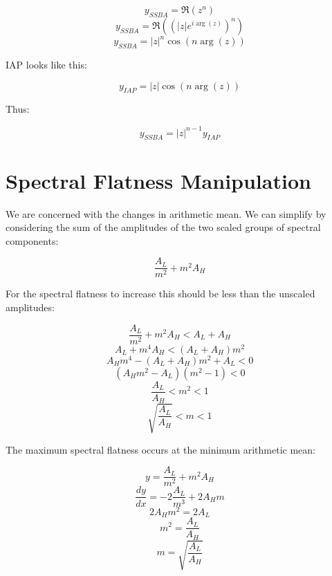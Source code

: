 \documentclass[a4paper]{article}
\begin{document}
	\[ y_{SSBA} = \Re \left( z^{n} \right) \]
	\[ y_{SSBA} = \Re \left( (|z|e^{i\arg(z)})^{n} \right) \]
	\[ y_{SSBA} = |z|^{n}\cos(n\arg(z)) \]

	IAP looks like this:

	\[ y_{IAP} = |z|\cos(n\arg(z)) \]

	Thus:

	\[ \boxed{y_{SSBA} = |z|^{n-1}y_{IAP}} \]

\section{Spectral Flatness Manipulation}
	We are concerned with the changes in arithmetic mean. We can simplify by considering the sum of the amplitudes of
	the two scaled groups of spectral components:

	\[ \frac{A_{L}}{m^{2}} + m^{2}A_{H} \]

	For the spectral flatness to increase this should be less than the unscaled amplitudes:

	\[ \frac{A_{L}}{m^{2}} + m^{2}A_{H} < A_{L} + A_{H} \]
	\[ A_{L} + m^{4}A_{H} < (A_{L} + A_{H})m^{2} \]
	\[ A_{H}m^{4} - (A_{L} + A_{H})m^{2} + A_{L} < 0 \]
	\[ (A_{H}m^{2} - A_{L})(m^{2} - 1) < 0 \]
	\[ \frac{A_{L}}{A_{H}} < m^{2} < 1 \]
	\[ \boxed{\sqrt{\frac{A_{L}}{A_{H}}} < m < 1} \]

	The maximum spectral flatness occurs at the minimum arithmetic mean:

	\[ y = \frac{A_{L}}{m^{2}} + m^{2}A_{H} \]
	\[ \frac{dy}{dx} = -2\frac{A_{L}}{m^{3}} + 2A_{H}m \]
	\[ 2A_{H}m^{2} = 2A_{L} \]
	\[ m^{2} = \frac{A_{L}}{A_{H}} \]
	\[ \boxed{m = \sqrt{\frac{A_{L}}{A_{H}}}} \]
\end{document}
